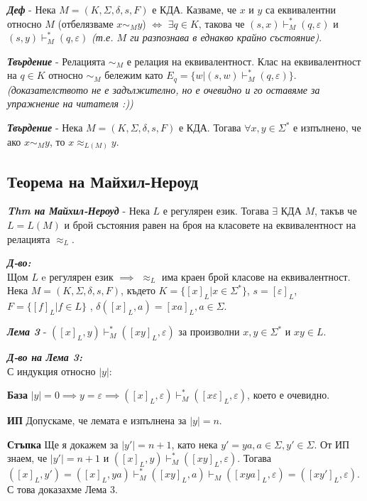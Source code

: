\documentclass[fleqn,12pt]{article}
\begin{document}
\begin{flushleft}
\textit{\textbf{Деф}} - Нека $M = (K, \Sigma, \delta, s, F)$ е КДА. Казваме, че $x$ и $y$ са еквивалентни относно $M$ (отбелязваме $x \sim_M y$) $\iff$ $\exists q \in K$, такова че $(s, x) \vdash_M^* (q, \varepsilon)$ и  $(s, y) \vdash_M^* (q, \varepsilon)$ \textit{(т.е. $M$ ги разпознава в еднакво крайно състояние)}.

\textit{\textbf{Твърдение}} - Релацията $\sim_M$ е релация на еквивалентност. Клас на еквивалентност на $q \in K$ относно $\sim_M$ бележим като $E_q = \{w | (s, w) \vdash_M^* (q, \varepsilon)\}$. \textit{(доказателството не е задължително, но е очевидно и го оставяме за упражнение на читателя :))}

\textit{\textbf{Твърдение}} - Нека $M = (K, \Sigma, \delta, s, F)$ е КДА. Тогава $\forall x, y \in \Sigma^*$ е изпълнено, че ако $x \sim_M y$, то $x \approx_{L(M)} y$.

\subsection{Теорема на Майхил-Нероуд}

\textit{\textbf{Thm на Майхил-Нероуд}} - Нека $L$ е регулярен език. Тогава $\exists$ КДА $M$, такъв че $L = L(M)$ и брой състояния равен на броя на класовете на еквивалентност на релацията $\approx_L$.

\textit{\textbf{Д-во:}}\\
Щом $L$ e регулярен език $\implies$ $\approx_L$ има краен брой класове на еквивалентност. \\
Нека $M = (K, \Sigma, \delta, s, F)$, където $K = \{[x]_L | x \in \Sigma^*\}$, $s = [\varepsilon]_L$, $F = \{[f]_L | f \in L\}$ , $\delta([x]_L, a) = [xa]_L, a \in \Sigma$.

\textit{\textbf{Лема 3}} - $([x]_L, y) \vdash_M^* ([xy]_L, \varepsilon)$ за произволни $x, y \in \Sigma^*$ и $xy \in L$.

\textit{\textbf{Д-во на Лема 3:}}\\
С индукция относно $|y|$:

\textbf{База} $|y| = 0 \implies y = \varepsilon \implies ([x]_L, \varepsilon) \vdash_M^* ([x\varepsilon]_L, \varepsilon)$, което е очевидно.

\textbf{ИП} Допускаме, че лемата е изпълнена за $|y| = n$.

\textbf{Стъпка} Ще я докажем за $|y'| = n + 1$, като нека $y' = ya, a \in \Sigma, y' \in \Sigma$. От ИП знаем, че $|y'| = n+1$ и $([x]_L, y) \vdash_M^* ([xy]_L, \varepsilon)$. Тогава $([x]_L, y') = ([x]_L, ya) \vdash_M^* ([xy]_L, a) \vdash_M ([xya]_L, \varepsilon) = ([xy']_L, \varepsilon)$. С това доказахме Лема 3.


\end{flushleft}
\end{document}
